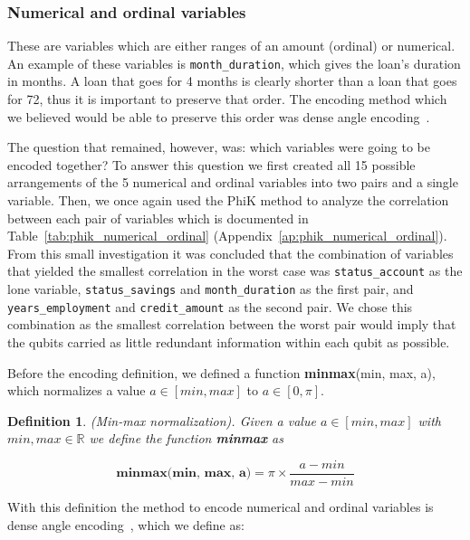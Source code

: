 \documentclass{ieeeaccess}
\newtheorem{definition}{Definition}[section]
\begin{document}
\subsubsection{Numerical and ordinal variables}

These are variables which are either ranges of an amount (ordinal) or numerical. An example of these variables is \texttt{month\_duration}, which gives the loan's duration in months. A loan that goes for 4 months is clearly shorter than a loan that goes for 72, thus it is important to preserve that order. The encoding method which we believed would be able to preserve this order was dense angle encoding~\cite{ibm_encoding}.

The question that remained, however, was: which variables were going to be encoded together? To answer this question we first created all 15 possible arrangements of the 5 numerical and ordinal variables into two pairs and a single variable. Then, we once again used the PhiK method to analyze the correlation between each pair of variables which is documented in Table~\ref{tab:phik_numerical_ordinal} (Appendix~\ref{ap:phik_numerical_ordinal}). From this small investigation it was concluded that the combination of variables that yielded the smallest correlation in the worst case was \texttt{status\_account} as the lone variable, \texttt{status\_savings} and \texttt{month\_duration} as the first pair, and \texttt{years\_employment} and \texttt{credit\_amount} as the second pair. We chose this combination as the smallest correlation between the worst pair would imply that the qubits carried as little redundant information within each qubit as possible.

Before the encoding definition, we defined a function \textbf{minmax}(min, max, a), which normalizes a value $a \in [min , max]$ to $a \in [0 , \pi ]$.

\begin{definition}
  (Min-max normalization). Given a value $a \in [min , max]$ with $min, max \in \mathbb{R}$ we define the function \textbf{minmax} as

  \[
    \textbf{minmax(min, max, a)} = \pi \times \frac{a-min}{max-min}
  \]
  \label{def:minmax}
\end{definition}

With this definition the method to encode numerical and ordinal variables is dense angle encoding~\cite{ibm_encoding}, which we define as:
\end{document}

